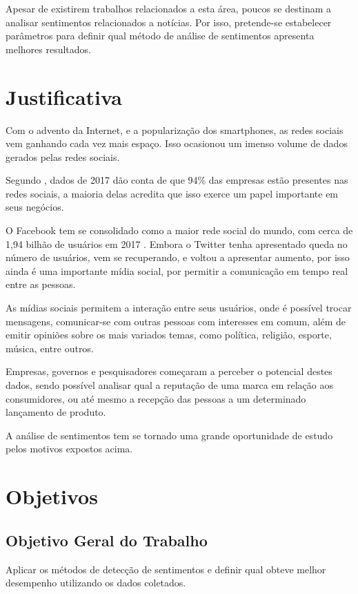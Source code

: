 \documentclass[12pt,article,a4paper,brazil,oldfontcommands,oneside]{abntex2}
\begin{document}
Apesar de existirem trabalhos relacionados a esta área, poucos se destinam a analisar sentimentos relacionados a notícias. Por isso, pretende-se estabelecer parâmetros para definir qual método de análise de sentimentos apresenta melhores resultados. 

\section{Justificativa}

Com o advento da Internet, e a popularização dos smartphones, as redes sociais vem ganhando cada vez mais espaço. Isso ocasionou um imenso volume de dados gerados pelas redes sociais. 

Segundo \cite{socialmediatrends}, dados de 2017 dão conta de que 94\% das empresas estão presentes nas redes sociais, a maioria delas acredita que isso exerce um papel importante em seus negócios.

O Facebook tem se consolidado como a maior rede social do mundo, com cerca de 1,94 bilhão de usuários em 2017 \cite{Facebook75:online}. Embora o Twitter tenha apresentado queda no número de usuários, vem se recuperando, e voltou a apresentar aumento, \cite{Twittert93:online} por isso ainda é uma importante mídia social, por permitir a comunicação em tempo real entre as pessoas.

As mídias sociais permitem a interação entre seus usuários, onde é possível trocar mensagens, comunicar-se com outras pessoas com interesses em comum, além de emitir opiniões sobre os mais variados temas, como política, religião, esporte, música, entre outros.

Empresas, governos e pesquisadores começaram a perceber o potencial destes dados, sendo possível analisar qual a reputação de uma marca em relação aos consumidores, ou até mesmo a recepção das pessoas a um determinado lançamento de produto.

A análise de sentimentos tem se tornado uma grande oportunidade de estudo pelos motivos expostos acima.

\section{Objetivos}
\subsection{Objetivo Geral do Trabalho}

Aplicar os métodos de detecção de sentimentos e definir qual obteve melhor desempenho utilizando os dados coletados.
\end{document}
